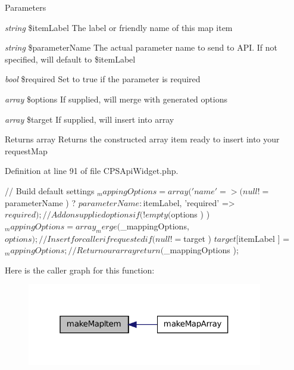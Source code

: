 \begin{DoxyParams}{Parameters}
\item[{\em string}]\$itemLabel The label or friendly name of this map item \item[{\em string}]\$parameterName The actual parameter name to send to API. If not specified, will default to \$itemLabel \item[{\em bool}]\$required Set to true if the parameter is required \item[{\em array}]\$options If supplied, will merge with generated options \item[{\em array}]\$target If supplied, will insert into array \end{DoxyParams}
\begin{DoxyReturn}{Returns}
array Returns the constructed array item ready to insert into your requestMap 
\end{DoxyReturn}


Definition at line 91 of file CPSApiWidget.php.




\begin{DoxyCode}
    {
        //  Build default settings
        $_mappingOptions = array(
            'name' => ( null != $parameterName ) ? $parameterName : $itemLabel,
            'required' => $required
        );

        //  Add on supplied options
        if ( ! empty( $options ) )
            $_mappingOptions = array_merge( $_mappingOptions, $options );

        //  Insert for caller if requested
        if ( null != $target )
            $target[ $itemLabel ] = $_mappingOptions;

        //  Return our array
        return( $_mappingOptions );
    }
\end{DoxyCode}




Here is the caller graph for this function:\nopagebreak
\begin{figure}[H]
\begin{center}
\leavevmode
\includegraphics[width=292pt]{classCPSApiWidget_a994fbc009e9ddb1dee7f559c53a12e7d_icgraph}
\end{center}
\end{figure}


